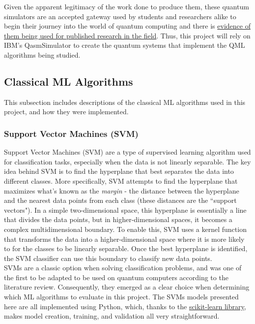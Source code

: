 \documentclass[11pt, oneside]{article}   	%
\begin{document}
\noindent\hspace{10mm}Given the apparent legitimacy of the work done to produce them, these quantum simulators are an accepted gateway used by students and researchers alike to begin their journey into the world of quantum computing and there is \href{https://www6.slac.stanford.edu/news/2023-01-30-researchers-take-step-toward-novel-quantum-simulators}{evidence of them being used for published research in the field}. Thus, this project will rely on IBM’s QasmSimulator to create the quantum systems that implement the QML algorithms being studied.


\subsection{Classical ML Algorithms}

\hspace{10mm}This subsection includes descriptions of the classical ML algorithms used in this project, and how they were implemented. 

\subsubsection{Support Vector Machines (SVM)}

\hspace{10mm}Support Vector Machines (SVM) are a type of supervised learning algorithm used for classification tasks, especially when the data is not linearly separable. The key idea behind SVM is to find the hyperplane that best separates the data into different classes. More specifically, SVM attempts to find the hyperplane that maximizes what's known as the \textit{margin} - the distance between the hyperplane and the nearest data points from each class (these distances are the ``support vectors"). In a simple two-dimensional space, this hyperplane is essentially a line that divides the data points, but in higher-dimensional spaces, it becomes a complex multidimensional boundary.  To enable this, SVM uses a kernel function that transforms the data into a higher-dimensional space where it is more likely to for the classes to be linearly separable. Once the best hyperplane is identified, the SVM classifier can use this boundary to classify new data points.\\

\noindent\hspace{10mm}SVMs are a classic option when solving classification problems, and was one of the first to be adapted to be used on quantum computers according to the literature review. Consequently, they emerged as a clear choice when determining which ML algorithms to evaluate in this project. The SVMs models presented here are all implemented using Python, which, thanks to the \href{https://scikit-learn.org/stable/}{scikit-learn library},  makes model creation, training, and validation all very straightforward.
\end{document}
